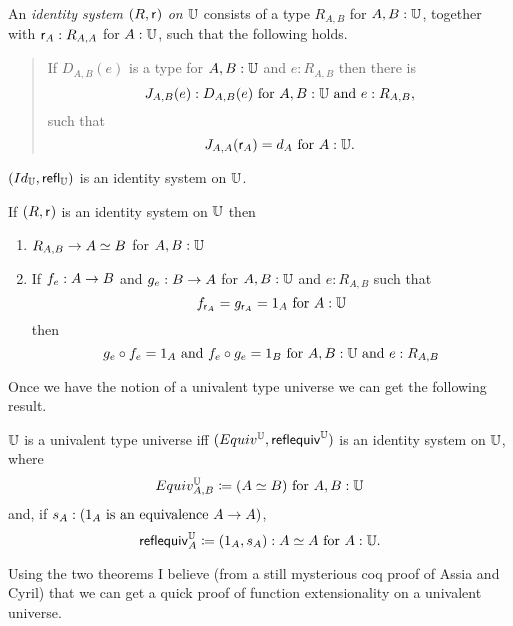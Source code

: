 \begin{defn} An {\em identity system $(R,{{\sf r}_{}})$ on $\mathbb{U}$} consists of a type $R_{A,B}$ for $A,B:\mathbb{U}$, together with ${{\sf r}_{A}}:R_{A,A}$ for $A:\mathbb{U}$, such that the following holds.  
\begin{quote}
If $D_{A,B}(e)$ is a type for $A,B:\mathbb{U}$ and $e:R_{A,B}$ then there is   
  \[ J_{A,B}(e):D_{A,B}(e)\mbox{ for } A,B:\mathbb{U} \mbox{ and } e:R_{A,B},\] 
such that
  \[ J_{A,A}({{\sf r}_{A}})=d_A\mbox{ for } A:\mathbb{U}.\]
\end{quote}
\end{defn}
\begin{eg}
$(Id_\mathbb{U},\mathsf{refl}_{\mathbb{U}})$ is an identity system on $\mathbb{U}$.
\end{eg}
\begin{thm}
If $(R,{{\sf r}_{}})$ is an identity system on $\mathbb{U}$ then
\begin{enumerate}
\item $R_{A,B}\rightarrow A \simeq B$ for $A,B:\mathbb{U}$
\item If $f_e:A\rightarrow B$ and $g_e:B\rightarrow A$ for $A,B:\mathbb{U}$ and $e:R_{A,B}$ such that 
  \[ f_{{{\sf r}_{A}}} = g_{{{\sf r}_{A}}}=1_A\mbox{ for } A:\mathbb{U}\] 
then
  \[ g_e\circ f_e =1_A\mbox{ and } f_e\circ g_e = 1_B
      \mbox{ for }  A,B:\mathbb{U} \mbox{ and } e:R_{A,B} \]
\end{enumerate}
\end{thm}
\newcommand{\sfequiv}[1]{{\sf reflequiv}^\bbU_{#1}}
\begin{rmk} Once we have the notion of a univalent type universe we can get the following result. 
\end{rmk}
\begin{thm}
$\mathbb{U}$ is a univalent type universe iff $(Equiv^\bbU,\sfequiv{})$ is an identity system on $\mathbb{U}$, where
  \[ Equiv^\mathbb{U}_{A,B}\coloneqq (A \simeq B)\mbox{ for } A,B:\mathbb{U}\]
and, if $s_A: (1_A\mbox{ is an equivalence }A\rightarrow A)$,
  \[ \sfequiv{A}\defeq (1_A,s_A):\eqv{A}{A}\mbox{ for } A:\bbU.\]
\end{thm}


Using the two theorems I believe (from a still mysterious coq proof of Assia and Cyril) that we can get a quick proof of function extensionality on a univalent universe.
